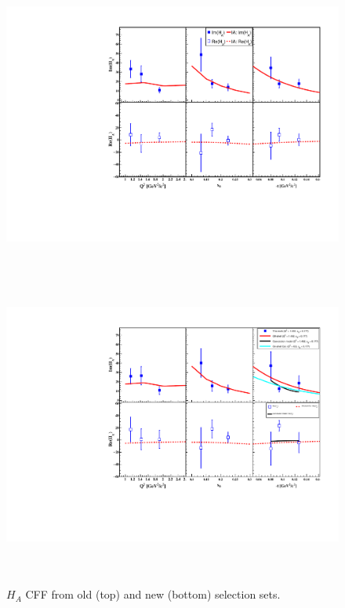 \begin{figure}[h!]
\centering
\includegraphics[height=10.0cm]{old_plots/updated_CFFs.pdf}
\includegraphics[height=10.0cm]{new_plots/CFF_Im_Re.pdf}
\caption{$H_{A}$ CFF from old (top) and new (bottom) selection sets.}
\label{fig:CFFs}
\end{figure}



